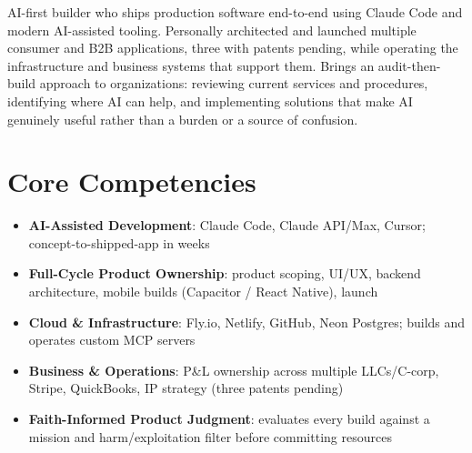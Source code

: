 \documentclass[11pt,a4paper,sans]{moderncv}
\begin{document}
\makecvtitle


\vspace{6pt}
\small{AI-first builder who ships production software end-to-end using Claude Code and modern AI-assisted tooling. Personally architected and launched multiple consumer and B2B applications, three with patents pending, while operating the infrastructure and business systems that support them. Brings an audit-then-build approach to organizations: reviewing current services and procedures, identifying where AI can help, and implementing solutions that make AI genuinely useful rather than a burden or a source of confusion.}


\section{Core Competencies}
\vspace{1pt}
\begin{itemize}

\item \textbf{AI-Assisted Development}: Claude Code, Claude API/Max, Cursor; concept-to-shipped-app in weeks

\item \textbf{Full-Cycle Product Ownership}: product scoping, UI/UX, backend architecture, mobile builds (Capacitor / React Native), launch

\item \textbf{Cloud \& Infrastructure}: Fly.io, Netlify, GitHub, Neon Postgres; builds and operates custom MCP servers

\item \textbf{Business \& Operations}: P\&L ownership across multiple LLCs/C-corp, Stripe, QuickBooks, IP strategy (three patents pending)

\item \textbf{Faith-Informed Product Judgment}: evaluates every build against a mission and harm/exploitation filter before committing resources

\end{itemize}

\end{document}
